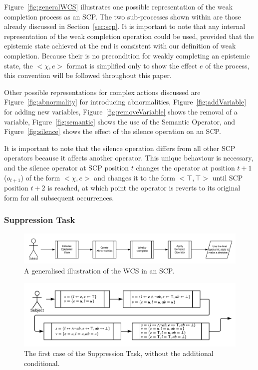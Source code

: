 \documentclass{article}
\begin{document}
Figure~\ref{fig:generalWCS} illustrates one possible representation of the weak completion process as an SCP. The two sub-processes shown within are those already discussed in Section~\ref{sec:scp}. It is important to note that any internal representation of the weak completion operation could be used, provided that the epistemic state achieved at the end is consistent with our definition of weak completion. Because their is no precondition for weakly completing an epistemic state, the $<\chi, e>$ format is simplified only to show the effect $e$ of the process, this convention will be followed throughout this paper.

Other possible representations for complex actions discussed are Figure~\ref{fig:abnormality} for introducing abnormalities, Figure~\ref{fig:addVariable} for adding new variables, Figure~\ref{fig:removeVariable} shows the removal of a variable, Figure~\ref{fig:semantic} shows the use of the Semantic Operator, and Figure~\ref{fig:silence} shows the effect of the silence operation on an SCP.

It is important to note that the silence operation differs from all other SCP operators because it affects another operator. This unique behaviour is necessary, and the silence operator at SCP position $t$ changes the operator at position $t+1$ ($o_{t+1}$) of the form $<\chi, e>$ and changes it to the form $<\top, \top>$ until SCP position $t+2$ is reached, at which point the operator is reverts to its original form for all subsequent occurrences.



\subsubsection{Suppression Task} \label{ssec:supTaskCPD}

\begin{figure}
\begin{center}
 \centering \includegraphics[scale=0.75]{suppressionSCP_overview}
\caption{A generalised illustration of the WCS in an SCP. }
\label {fig:supoverview}
\end{center}
\end{figure}

\begin{figure}
\begin{center}
 \centering \includegraphics[scale=0.75]{suppressionSCP_simple}
\caption{The first case of the Suppression Task, without the additional conditional. }
\label {fig:supsimple}
\end{center}
\end{figure}
\end{document}
